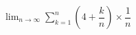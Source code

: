 \hspace*{2mm}\begin{minipage}[t]{\dimexpr\linewidth-2mm\relax}\vspace{0pt}
$\displaystyle\lim_{n\to\infty}\sum_{k=1}^{n}\left(4+\dfrac{k}{n}\right)\times\dfrac{1}{n}$\end{minipage}
